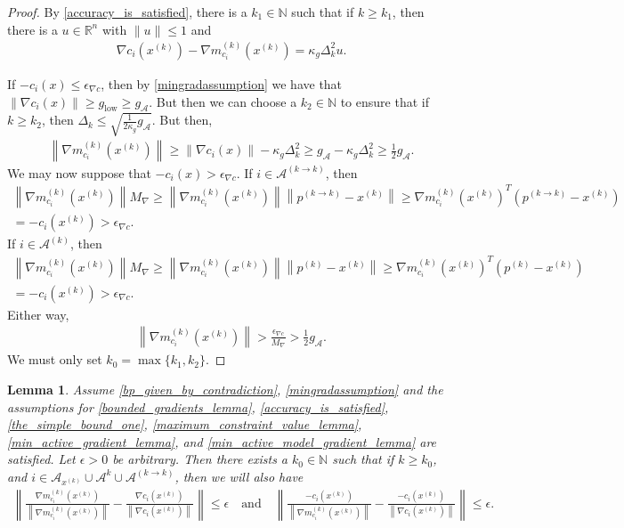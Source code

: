 \documentclass{article}
\newtheorem{lemma}[theorem]{Lemma}
\theoremstyle{case}
\numberwithin{theorem}{subsection}
\newcommand{\dk}{\Delta_k}
\newcommand{\gmcik}{{\nabla m_{c_i}^{(k)}\left(\xk\right)}}
\newcommand{\maxgrad}{{M_{\nabla}}}
\newcommand{\minactivegrad}{{ g_{\mathcal A} }}
\newcommand{\mingradepsilon}{{\epsilon_{\nabla c}}}
\newcommand{\mingrad}{{ g_{\textrm{low}} }}
\newcommand{\naturals}{\mathbb N}
\newcommand{\Rn}{\mathbb R^n}
\newcommand{\xk}{{x^{(k)}}}
\begin{document}
\begin{proof}
By \cref{accuracy_is_satisfied}, there is a $k_1 \in \naturals $ such that if $k \ge k_1$, then there is a $u \in \Rn$ with $\|u\| \le 1$ and
\begin{align*}
\nabla c_i(\xk) - \gmcik = \kappa_g \dk^2 u.
\end{align*}

If $-c_i(x) \le \mingradepsilon$, then by \cref{mingradassumption} we have that $\|\nabla c_i(x)\| \ge \mingrad \ge \minactivegrad$.
But then we can choose a $k_2 \in \naturals$ to ensure that if $k \ge k_2$, then $\dk \le \sqrt{\frac 1 {2\kappa_g} \minactivegrad}$.
But then,
\begin{align*}
\left\|\gmcik\right\| \ge \|\nabla c_i(x)\| - \kappa_g \dk^2 \ge \minactivegrad - \kappa_g \dk^2 \ge \frac 1 2 \minactivegrad.
\end{align*}
We may now suppose that $-c_i(x) > \mingradepsilon$.
If $i \in \mathcal A^{(k\to k)}$, then
\begin{align*}
\left\|\gmcik\right\| \maxgrad \ge \left\|\gmcik\right\|\left\|p^{(k\to k)} - \xk\right\|
\ge \gmcik^T\left(p^{(k\to k)} - \xk\right) \\
= -c_i(\xk) > \mingradepsilon.
\end{align*}
If $i \in \mathcal A^{(k)}$, then
\begin{align*}
\left\|\gmcik\right\| \maxgrad \ge \left\|\gmcik\right\|\left\|p^{(k)} - \xk\right\|
\ge \gmcik^T\left(p^{(k)} - \xk\right) \\
= -c_i(\xk) > \mingradepsilon.
\end{align*}
Either way,
\begin{align*}
\left\|\gmcik\right\| > \frac {\mingradepsilon} {\maxgrad} > \frac 1 2 \minactivegrad.
\end{align*}
We must only set $k_0 = \max\{k_1, k_2\}$.
\end{proof}



\begin{lemma}
\label{bp_models_are_close_to_true_values}
Assume \cref{bp_given_by_contradiction}, \cref{mingradassumption} and the assumptions for
\cref{bounded_gradients_lemma},
\cref{accuracy_is_satisfied},
\cref{the_simple_bound_one},
\cref{maximum_constraint_value_lemma},
\cref{min_active_gradient_lemma},
and \cref{min_active_model_gradient_lemma}
are satisfied.
Let $\epsilon > 0$ be arbitrary.
Then there exists a $k_0 \in \naturals$ such that if $k \ge k_0$, and $i \in \mathcal A_{\xk} \cup \mathcal A^{k} \cup \mathcal A^{(k \to k)} $,
then we will also have%
\begin{align*}
\left\|\frac{\gmcik}{\left\|\gmcik\right\|} - \frac{\nabla c_i\left(\xk\right)}{\left\|\nabla c_i\left(\xk \right)\right\|} \right\| \le \epsilon \quad \textrm{and} \quad
\left\|\frac{-c_i\left(\xk \right)}{\left\|\gmcik\right\|} - \frac{-c_i\left(\xk \right)}{\left\|\nabla c_i\left(\xk \right)\right\|} \right\| \le \epsilon.
\end{align*}
\end{lemma}
\end{document}
